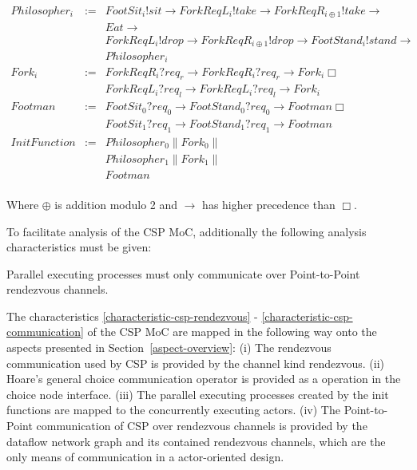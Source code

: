 \begin{displaymath}
\begin{array}{rcl}
Philosopher_{i}    & := & FootSit_{i}!sit \to ForkReqL_{i}!take \to ForkReqR_{i\oplus1}!take \to \\
                   &    & Eat \to \\
                   &    & ForkReqL_{i}!drop \to ForkReqR_{i\oplus1}!drop \to FootStand_{i}!stand \to \\
                   &        & Philosopher_{i} \\
Fork_{i}           & := & ForkReqR_{i}?req_{r} \to ForkReqR_{i}?req_{r} \to Fork_{i} \Box \\
                   &    & ForkReqL_{i}?req_{l} \to ForkReqL_{i}?req_{l} \to Fork_{i} \\
Footman                   & := & FootSit_{0}?req_{0} \to FootStand_{0}?req_{0} \to Footman \Box \\
                   &    & FootSit_{1}?req_{1} \to FootStand_{1}?req_{1} \to Footman \\
InitFunction       & := & Philosopher_{0} \| Fork_{0} \| \\
                   &    & Philosopher_{1} \| Fork_{1} \| \\
                   &    & Footman \\
\end{array}
\end{displaymath}

Where $\oplus$ is addition modulo 2 and $\to$ has higher precedence than $\Box$.

To facilitate analysis of the CSP MoC, additionally the following
analysis characteristics must be given:
\begin{characteristic}\label{characteristic-csp-communication}
  Parallel executing processes must only communicate over Point-to-Point rendezvous channels.
\end{characteristic}

The characteristics \ref{characteristic-csp-rendezvous} -
\ref{characteristic-csp-communication} of the CSP MoC are mapped in the following way
onto the aspects presented in Section~\ref{aspect-overview}:
(i) The rendezvous communication %
used by CSP is provided by the channel kind rendezvous. %
(ii) Hoare's general choice communication operator %
is provided as a operation in the choice node interface. %
(iii) The parallel executing processes %
created by the init functions are mapped to the concurrently executing actors.
(iv) The Point-to-Point communication of CSP over rendezvous channels %
is provided by the dataflow network graph %
and its contained rendezvous channels, which are the only means of communication in a
actor-oriented design.

